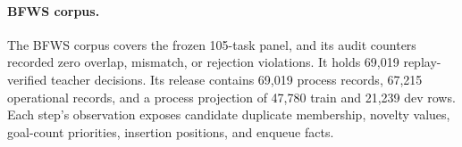\paragraph{BFWS corpus.}
The BFWS corpus covers the frozen 105-task panel, and its audit counters recorded zero overlap, mismatch, or rejection violations. It holds 69,019 replay-verified teacher decisions. Its release contains 69,019 process records, 67,215 operational records, and a process projection of 47,780 train and 21,239 dev rows. Each step's observation exposes candidate duplicate membership, novelty values, goal-count priorities, insertion positions, and enqueue facts.

